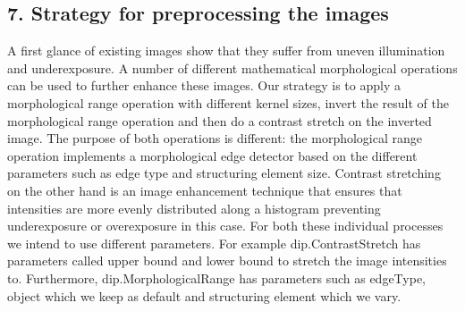\documentclass{article}
\begin{document}
\subsection*{7. Strategy for preprocessing the images}
A first glance of existing images show that they suffer from uneven illumination and underexposure. A number of different mathematical morphological operations can be used to further enhance these images. Our strategy is to apply a morphological range operation with different kernel sizes, invert the result of the morphological range operation and then do a contrast stretch on the inverted image. The purpose of both operations is different: the morphological range operation implements a morphological edge detector based on the different parameters such as edge type and structuring element size. Contrast stretching on the other hand is an image enhancement technique that ensures that intensities are more evenly distributed along a histogram preventing underexposure or overexposure in this case. \newline \newline
For both these individual processes we intend to use different parameters. For example dip.ContrastStretch has parameters called upper bound and lower bound to stretch the image intensities to. Furthermore, dip.MorphologicalRange has parameters such as edgeType, object which we keep as default and structuring element which we vary. 
\end{document}
